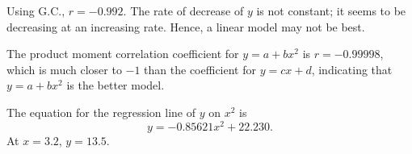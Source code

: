 \begin{solution}
    \begin{ppart}
        \begin{figure}[H]
            \centering
        \end{figure}
    \end{ppart}
    \begin{ppart}
        Using G.C., $r = -0.992$. The rate of decrease of $y$ is not constant; it seems to be decreasing at an increasing rate. Hence, a linear model may not be best. 
    \end{ppart}
    \begin{ppart}
        The product moment correlation coefficient for $y = a + bx^2$ is $r = -0.99998$, which is much closer to $-1$ than the coefficient for $y = cx + d$, indicating that $y = a + bx^2$ is the better model.
    \end{ppart}
    \begin{ppart}
        The equation for the regression line of $y$ on $x^2$ is \[y = -0.85621x^2 + 22.230.\] At $x = 3.2$, $y = 13.5$.
    \end{ppart}
\end{solution}


